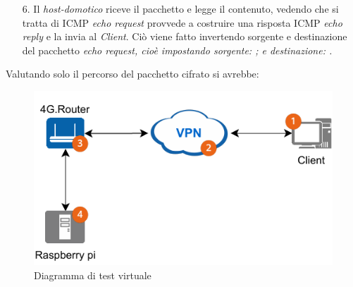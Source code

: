 \begin{enumerate}
    Possiamo vedere il pacchetto in uscita dal server mettendoci in ascolto sull'interfaccia \it{ens3}:
\begin{bashcode}{Server}{}
$ sudo tcpdump -i ens3 -n port 1194
15:43:15.543273 IP 51.178.141.119.1194 > 151.47.152.251.40637: UDP, length 108
\end{bashcode}


    \item[4.] Il NAT effettua la traduzione, modificando l'IP e la porta del pacchetto esterno e lo inoltra all'interfaccia \textit{wan} del \textit{Router}.
    

    \item[5.] Il \textit{Router} riceve il pacchetto e lo decifra. Vedendo che il pacchetto interno è destinato alla subnet \code{192.168.130.0/24} lo inoltra alla sua \textit{lan} (sezione \ref{subsec:creazione-firewall-zone-vpn} e \ref{subsec:aggiunta-interfaccia-tun0-zona-vpn}). Il pacchetto interno viene quindi inoltrato all'\textit{host-domotico} (\code{192.168.130.2}). In questo caso è possibile vedere il percorso del pacchetto decifrato con \code{tcpdump}:
\begin{bashcode}{Router}{}
$ tcpdump -i tun0
listening on tun0, link-type RAW (Raw IP), capture size 262144 bytes
10:44:07.228387 IP 10.8.0.2 > 192.168.130.2: ICMP echo request, id 12, seq 1, length 64
\end{bashcode}
    
    \item[6.] Il \textit{host-domotico} riceve il pacchetto e legge il contenuto, vedendo che si tratta di ICMP \textit{echo request} provvede a costruire una risposta ICMP \textit{echo reply} e la invia al \textit{Client}. Ciò viene fatto invertendo sorgente e destinazione del pacchetto \it{echo request}, cioè impostando sorgente: ; e destinazione: .

\end{enumerate}

Valutando solo il percorso del pacchetto cifrato si avrebbe:

\begin{figure}[H]
    \centering
    \includegraphics[width=0.5\linewidth]{immagini/diag2-test_virtual}
    \caption{Diagramma di test virtuale}
    \label{fig:diag-test_virtual}
\end{figure}







